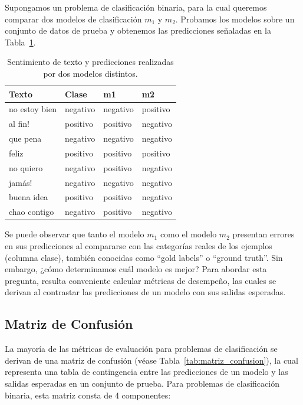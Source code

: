 \documentclass[11pt,fleqn]{book} %
\begin{document}
\begin{example}
Supongamos un problema de clasificación binaria, para la cual queremos comparar dos modelos de clasificación $m_1$ y $m_2$. Probamos los modelos sobre un conjunto de datos de prueba y obtenemos las predicciones señaladas en la Tabla~\ref{tab:ej_sentimiento}.

\begin{table}[htbp]
\centering
\begin{tabular}{|l|l|l|l|}
\hline
\textbf{Texto} & \textbf{Clase} & \textbf{m1} & \textbf{m2} \\
\hline
no estoy bien & negativo & negativo & positivo \\
al fin! & positivo & positivo & negativo \\
que pena & negativo & negativo & negativo \\
feliz & positivo & positivo & positivo \\
no quiero & negativo & positivo & negativo \\
jamás! & negativo & negativo & negativo \\
buena idea & positivo & positivo & negativo \\
chao contigo & negativo & positivo & negativo \\
\hline
\end{tabular}
\caption{Sentimiento de texto y predicciones realizadas por dos modelos distintos.}
\label{tab:ej_sentimiento}
\end{table}

Se puede observar que tanto el modelo $m_1$ como el modelo $m_2$ presentan errores en sus predicciones al compararse con las categorías reales de los ejemplos (columna clase), también conocidas como ``gold labels'' o ``ground truth''. Sin embargo, ¿cómo determinamos cuál modelo es mejor? Para abordar esta pregunta, resulta conveniente calcular métricas de desempeño, las cuales se derivan al contrastar las predicciones de un modelo con sus salidas esperadas.
\end{example}

\subsection{Matriz de Confusión}

La mayoría de las métricas de evaluación para problemas de clasificación se derivan de una matriz de confusión (véase Tabla~\ref{tab:matriz_confusion}), la cual representa una tabla de contingencia entre las predicciones de un modelo y las salidas esperadas en un conjunto de prueba. Para problemas de clasificación binaria, esta matriz consta de 4 componentes:
\end{document}

